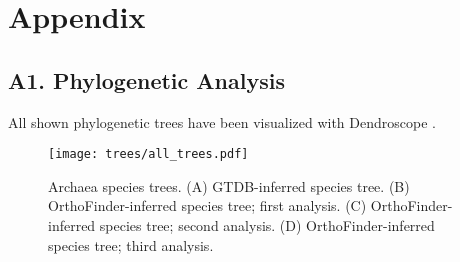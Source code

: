 \newpage
\appendix
\section{Appendix}
\setcounter{figure}{0}
\setcounter{table}{0}
\noappendixindent

\subsection*{A1. Phylogenetic Analysis}
\normalsize
All shown phylogenetic trees have been visualized with Dendroscope \cite{huson2012}.

\begin{figure}[h!tbp]
    \centering
    \renewcommand{\thefigure}{A\arabic{figure}}
    \texttt{[image: trees/all\_trees.pdf]}
    \caption{Archaea species trees. (A) GTDB-inferred species tree. (B) OrthoFinder-inferred species tree; first analysis. (C) OrthoFinder-inferred species tree; second analysis. (D) OrthoFinder-inferred species tree; third analysis.}
    \label{phylum_trees_all}
\end{figure}






